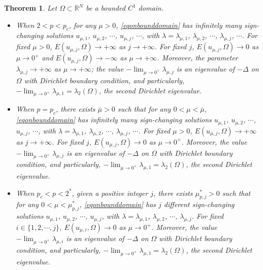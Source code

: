 \documentclass[10pt,a4paper]{amsart}
\newtheorem{theorem}{Theorem}
\newcommand{\R}{\mathbb{R}}
\newcommand{\la}{\lambda}
\begin{document}
\begin{theorem} \label{thmsmall}
	Let $\Omega \subset \R^N$ be a bounded $C^1$ domain.
	\begin{itemize}
		\item[(i)] When $2 < p < p_c$, for any $\mu > 0$, \eqref{eqonbounddomain} has infinitely many sign-changing solutions $u_{\mu,1}$, $u_{\mu,2}$, $\cdots$, $u_{\mu,j}$, $\cdots$, with $\la = \la_{\mu,1}$, $\la_{\mu,2}$, $\cdots$, $\la_{\mu,j}$, $\cdots$.
		For fixed $\mu > 0$, $E(u_{\mu,j},\Omega) \to +\infty$ as $j \to +\infty$. For fixed $j$, $E(u_{\mu,j},\Omega) \to 0$ as $\mu \to 0^+$ and $E(u_{\mu,j},\Omega) \to -\infty$ as $\mu \to +\infty$. Moreover, the parameter $\displaystyle \la_{\mu,j} \to +\infty$ as $\mu \to +\infty$; the value $\displaystyle -\lim_{\mu \to 0^+}\la_{\mu,j}$ is an eigenvalue of $-\Delta$ on $\Omega$ with Dirichlet boundary condition, and particularly, $\displaystyle -\lim_{\mu \to 0^+}\la_{\mu,1} = \la_2(\Omega)$, the second Dirichlet eigenvalue.
		\item[(ii)] When $p = p_c$, there exists $\bar \mu > 0$ such that for any $0 < \mu < \bar \mu$, \eqref{eqonbounddomain} has infinitely many sign-changing solutions $u_{\mu,1}$, $u_{\mu,2}$, $\cdots$, $u_{\mu,j}$, $\cdots$, with $\la = \la_{\mu,1}$, $\la_{\mu,2}$, $\cdots$, $\la_{\mu,j}$, $\cdots$. For fixed $\mu > 0$, $E(u_{\mu,j},\Omega) \to +\infty$ as $j \to +\infty$. For fixed $j$, $E(u_{\mu,j},\Omega) \to 0$ as $\mu \to 0^+$. Moreover, the value $-\lim_{\mu \to 0^+}\la_{\mu,j}$ is an eigenvalue of $-\Delta$ on $\Omega$ with Dirichlet boundary condition, and particularly, $\displaystyle -\lim_{\mu \to 0^+}\la_{\mu,1} = \la_2(\Omega)$, the second Dirichlet eigenvalue.
		\item[(iii)] When $p_c < p < 2^*$, given a positive integer $j$, there exists $\mu^*_{p,j} > 0$ such that for any $0 < \mu < \mu^*_{p,j}$, \eqref{eqonbounddomain} has $j$ different sign-changing solutions $u_{\mu,1}$, $u_{\mu,2}$, $\cdots$, $u_{\mu,j}$, with $\la = \la_{\mu,1}$, $\la_{\mu,2}$, $\cdots$, $\la_{\mu,j}$. For fixed $i \in \{1,2,\cdots,j\}$, $E(u_{\mu,i},\Omega) \to 0$ as $\mu \to 0^+$. Moreover, the value $\displaystyle -\lim_{\mu \to 0^+}\la_{\mu,i}$ is an eigenvalue of $-\Delta$ on $\Omega$ with Dirichlet boundary condition, and particularly, $\displaystyle -\lim_{\mu \to 0^+}\la_{\mu,1} = \la_2(\Omega)$, the second Dirichlet eigenvalue.
	\end{itemize}
\end{theorem}
\end{document}
